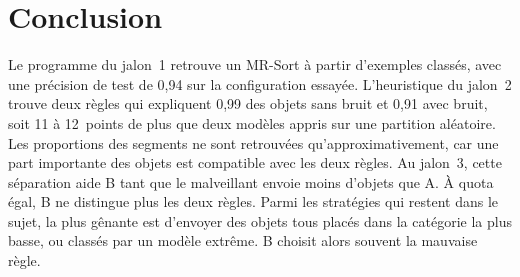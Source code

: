 \documentclass[11pt,a4paper]{article}
\begin{document}
\section{Conclusion}

Le programme du jalon~1 retrouve un MR-Sort à partir d'exemples classés, avec une précision de test de 0,94 sur la configuration essayée. L'heuristique du jalon~2 trouve deux règles qui expliquent 0,99 des objets sans bruit et 0,91 avec bruit, soit 11 à 12~points de plus que deux modèles appris sur une partition aléatoire. Les proportions des segments ne sont retrouvées qu'approximativement, car une part importante des objets est compatible avec les deux règles. Au jalon~3, cette séparation aide B tant que le malveillant envoie moins d'objets que A. À quota égal, B ne distingue plus les deux règles. Parmi les stratégies qui restent dans le sujet, la plus gênante est d'envoyer des objets tous placés dans la catégorie la plus basse, ou classés par un modèle extrême. B choisit alors souvent la mauvaise règle.
\end{document}
